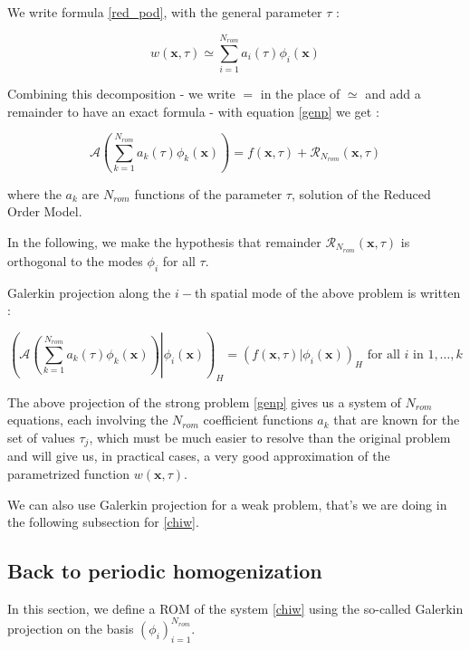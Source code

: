 We write formula \ref{red_pod}, with the general parameter $\tau$ :

\begin{equation}
w(\mathbf{x},\tau)\simeq\sum\limits_{i=1}^{N_{rom}} a_i(\tau)\phi_i(\mathbf{x})
\end{equation}

Combining this decomposition - we write $=$ in the place of $\simeq$ and add a remainder to have an exact formula - with equation \ref{genp} we get :

\[%
\mathcal{A}\left(\sum\limits_{k=1}^{N_{rom}} a_k(\tau)\phi_k(\mathbf{x})\right) %
= f\left(\mathbf{x},\tau\right) + \mathcal{R}_{N_{rom}}(\mathbf{x},\tau)%
\]

where the $a_k$ are $N_{rom}$ functions of the parameter $\tau$, solution of the Reduced Order Model.

\etoile
In the following, we make the hypothesis that remainder $\mathcal{R}_{N_{rom}}(\mathbf{x},\tau)$ is orthogonal to the modes $\phi_i$ for all $\tau$.

\par
Galerkin projection along the $i-$th spatial mode of the above problem is written :

\[%
\left(\left.\mathcal{A}\left(\sum\limits_{k=1}^{N_{rom}} a_k(\tau)\phi_k(\mathbf{x})\right) \right|\phi_i\left(\mathbf{x}\right)\right)_H %
= \left(f\left(\mathbf{x},\tau\right)|\phi_i(\mathbf{x})\right)_H%
\text{ for all $i$ in $1,\dots , k$}%
\]

\par
The above projection of the strong problem \ref{genp} gives us a system of $N_{rom}$ equations, each involving the $N_{rom}$ coefficient functions $a_k$ %
that are known for the set of values $\tau_j$, which must be much easier to resolve than the original problem and will give us, %
in practical cases, a very good approximation of the parametrized function $w(\mathbf{x},\tau)$.

\etoile
We can also use Galerkin projection for a weak problem, that's we are doing in the following subsection for \ref{chiw}.

\subsection{Back to periodic homogenization}\label{rom_chi}

In this section, we define a ROM of the system \ref{chiw} using the so-called Galerkin projection on the basis $(\phi_i)_{i=1}^{N_{rom}}$.

